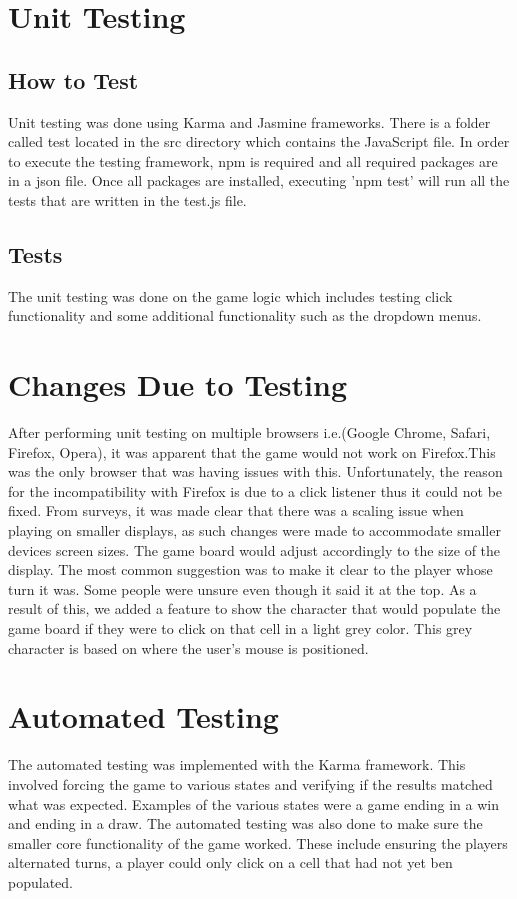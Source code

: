 \documentclass[12pt, titlepage]{article}
\begin{document}
\section{Unit Testing}
\subsection{How to Test}
Unit testing was done using Karma and Jasmine frameworks. There is a folder called test
located in the src directory which contains the JavaScript file. In order to execute the testing framework, 
npm is required and all required packages are in a json file. Once all packages are installed, 
executing 'npm test' will run all the tests that are written in the test.js file.
\subsection{Tests}
The unit testing was done on the game logic which includes testing click functionality and some additional functionality such as the dropdown menus.
\section{Changes Due to Testing} \label{ChangesAfterTesting}
After performing unit testing on multiple browsers i.e.(Google Chrome, Safari, Firefox, Opera),
it was apparent that the game would not work on Firefox.This was the only browser that was having issues with this. Unfortunately, the reason for the incompatibility with Firefox is due to a click listener thus it could not be fixed. From surveys, it was made clear that there was a scaling issue when playing on smaller displays, as such
changes were made to accommodate smaller devices screen sizes. The game board would adjust 
accordingly to the size of the display. The most common suggestion was to make it clear to the player whose turn it was. Some people were unsure even though it said it at the top. As a result of this, we added a feature to show 
the character that would populate the game board if they were to click on that cell in a light grey color. This 
grey character is based on where the user's mouse is positioned. 
\section{Automated Testing}
The automated testing was implemented with the Karma framework. This involved forcing the game
to various states and verifying if the results matched what was expected. Examples of the various 
states were a game ending in a win and ending in a draw. The automated testing was also done to
make sure the smaller core functionality of the game worked. These include ensuring the players
alternated turns, a player could only click on a cell that had not yet ben populated. 
\end{document}
